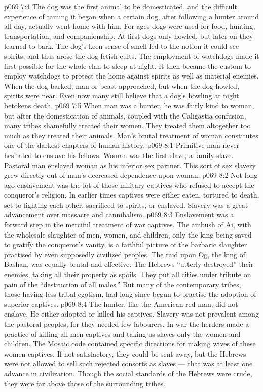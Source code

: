 \vs p069 7:4 The dog was the first animal to be domesticated, and the difficult experience of taming it began when a certain dog, after following a hunter around all day, actually went home with him. For ages dogs were used for food, hunting, transportation, and companionship. At first dogs only howled, but later on they learned to bark. The dog’s keen sense of smell led to the notion it could see spirits, and thus arose the dog\hyp{}fetish cults. The employment of watchdogs made it first possible for the whole clan to sleep at night. It then became the custom to employ watchdogs to protect the home against spirits as well as material enemies. When the dog barked, man or beast approached, but when the dog howled, spirits were near. Even now many still believe that a dog’s howling at night betokens death.
\vs p069 7:5 When man was a hunter, he was fairly kind to woman, but after the domestication of animals, coupled with the Caligastia confusion, many tribes shamefully treated their women. They treated them altogether too much as they treated their animals. Man’s brutal treatment of woman constitutes one of the darkest chapters of human history.
\vs p069 8:1 Primitive man never hesitated to enslave his fellows. Woman was the first slave, a family slave. Pastoral man enslaved woman as his inferior sex partner. This sort of sex slavery grew directly out of man’s decreased dependence upon woman.
\vs p069 8:2 Not long ago enslavement was the lot of those military captives who refused to accept the conqueror’s religion. In earlier times captives were either eaten, tortured to death, set to fighting each other, sacrificed to spirits, or enslaved. Slavery was a great advancement over massacre and cannibalism.
\vs p069 8:3 Enslavement was a forward step in the merciful treatment of war captives. The ambush of Ai, with the wholesale slaughter of men, women, and children, only the king being saved to gratify the conqueror’s vanity, is a faithful picture of the barbaric slaughter practised by even supposedly civilized peoples. The raid upon Og, the king of Bashan, was equally brutal and effective. The Hebrews “utterly destroyed” their enemies, taking all their property as spoils. They put all cities under tribute on pain of the “destruction of all males.” But many of the contemporary tribes, those having less tribal egotism, had long since begun to practise the adoption of superior captives.
\vs p069 8:4 The hunter, like the American red man, did not enslave. He either adopted or killed his captives. Slavery was not prevalent among the pastoral peoples, for they needed few labourers. In war the herders made a practice of killing all men captives and taking as slaves only the women and children. The Mosaic code contained specific directions for making wives of these women captives. If not satisfactory, they could be sent away, but the Hebrews were not allowed to sell such rejected consorts as slaves --- that was at least one advance in civilization. Though the social standards of the Hebrews were crude, they were far above those of the surrounding tribes.
